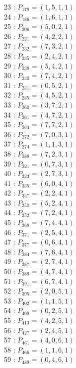 \documentclass{article}
\begin{document}
{\begin{multicols}{3}
23 : $P_{178}=( 1, 5, 1, 1 )$\\
24 : $P_{186}=( 1, 6, 1, 1 )$\\
25 : $P_{206}=( 5, 0, 2, 1 )$\\
26 : $P_{221}=( 4, 2, 2, 1 )$\\
27 : $P_{232}=( 7, 3, 2, 1 )$\\
28 : $P_{235}=( 2, 4, 2, 1 )$\\
29 : $P_{238}=( 5, 4, 2, 1 )$\\
30 : $P_{240}=( 7, 4, 2, 1 )$\\
31 : $P_{241}=( 0, 5, 2, 1 )$\\
32 : $P_{245}=( 4, 5, 2, 1 )$\\
33 : $P_{260}=( 3, 7, 2, 1 )$\\
34 : $P_{261}=( 4, 7, 2, 1 )$\\
35 : $P_{264}=( 7, 7, 2, 1 )$\\
36 : $P_{272}=( 7, 0, 3, 1 )$\\
37 : $P_{274}=( 1, 1, 3, 1 )$\\
38 : $P_{288}=( 7, 2, 3, 1 )$\\
39 : $P_{321}=( 0, 7, 3, 1 )$\\
40 : $P_{323}=( 2, 7, 3, 1 )$\\
41 : $P_{335}=( 6, 0, 4, 1 )$\\
42 : $P_{347}=( 2, 2, 4, 1 )$\\
43 : $P_{350}=( 5, 2, 4, 1 )$\\
44 : $P_{352}=( 7, 2, 4, 1 )$\\
45 : $P_{368}=( 7, 4, 4, 1 )$\\
46 : $P_{371}=( 2, 5, 4, 1 )$\\
47 : $P_{377}=( 0, 6, 4, 1 )$\\
48 : $P_{384}=( 7, 6, 4, 1 )$\\
49 : $P_{387}=( 2, 7, 4, 1 )$\\
50 : $P_{389}=( 4, 7, 4, 1 )$\\
51 : $P_{391}=( 6, 7, 4, 1 )$\\
52 : $P_{395}=( 2, 0, 5, 1 )$\\
53 : $P_{402}=( 1, 1, 5, 1 )$\\
54 : $P_{409}=( 0, 2, 5, 1 )$\\
55 : $P_{413}=( 4, 2, 5, 1 )$\\
56 : $P_{427}=( 2, 4, 5, 1 )$\\
57 : $P_{461}=( 4, 0, 6, 1 )$\\
58 : $P_{466}=( 1, 1, 6, 1 )$\\
59 : $P_{489}=( 0, 4, 6, 1 )$\\

\end{multicols}}
\end{document}
